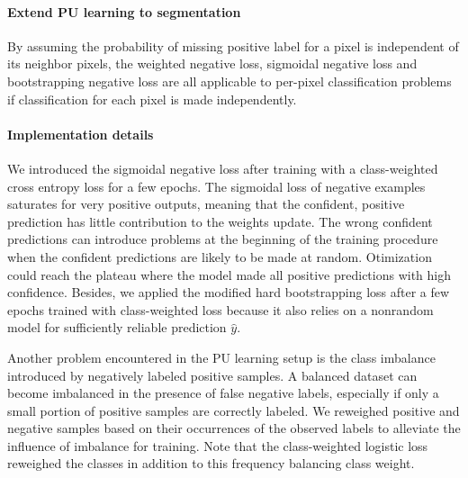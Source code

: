 \paragraph{Extend PU learning to segmentation}

By assuming the probability of missing positive label for a pixel is independent of its neighbor pixels, the weighted negative loss, sigmoidal negative loss and bootstrapping negative loss are all applicable to per-pixel classification problems if classification for each pixel is made independently.


\paragraph{Implementation details}

We introduced the sigmoidal negative loss after training with a class-weighted cross entropy loss for a few epochs.
The sigmoidal loss of negative examples saturates for very positive outputs, meaning that the confident, positive prediction has little contribution to the weights update.
The wrong confident predictions can introduce problems at the beginning of the training procedure when the confident predictions are likely to be made at random.
Otimization could reach the plateau where the model made all positive predictions with high confidence.
Besides, we applied the modified hard bootstrapping loss after a few epochs trained with class-weighted loss because it also relies on a nonrandom model for sufficiently reliable prediction $\hat{y}$.



Another problem encountered in the PU learning setup is the class imbalance introduced by negatively labeled positive samples.
A balanced dataset can become imbalanced in the presence of false negative labels, especially if only a small portion of positive samples are correctly labeled.
We reweighed positive and negative samples based on their occurrences of the observed labels to alleviate the influence of imbalance for training.
Note that the class-weighted logistic loss reweighed the classes in addition to this frequency balancing class weight.
